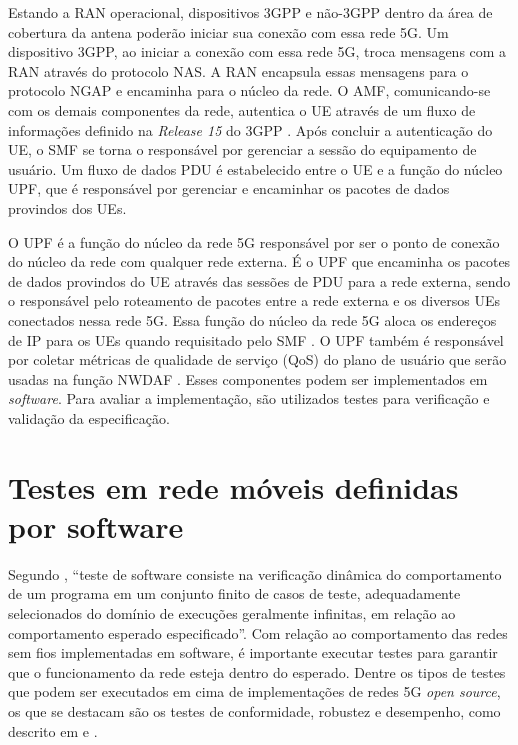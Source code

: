 Estando a RAN operacional, dispositivos 3GPP e não-3GPP dentro da área de cobertura da antena poderão iniciar sua conexão com essa rede 5G. Um dispositivo 3GPP, ao iniciar a conexão com essa rede 5G, troca mensagens com a RAN através do protocolo NAS. A RAN encapsula essas mensagens para o protocolo NGAP e encaminha para o núcleo da rede. O AMF, comunicando-se com os demais componentes da rede, autentica o UE através de um fluxo de informações definido na \textit{Release 15} do 3GPP \cite{3gpp.29.509}. Após concluir a autenticação do UE, o SMF se torna o responsável por gerenciar a sessão do equipamento de usuário. Um fluxo de dados PDU é estabelecido entre o UE e a função do núcleo UPF, que é responsável por gerenciar e encaminhar os pacotes de dados provindos dos UEs.

O UPF é a função do núcleo da rede 5G responsável por ser o ponto de conexão do núcleo da rede com qualquer rede externa.
É o UPF que encaminha os pacotes de dados provindos do UE através das sessões de PDU para a rede externa, sendo o responsável pelo roteamento de pacotes entre a rede externa e os diversos UEs conectados nessa rede 5G.
Essa função do núcleo da rede 5G aloca os endereços de IP para os UEs quando requisitado pelo SMF \cite{3gpp.23.501}.
O UPF também é responsável por coletar métricas de qualidade de serviço (QoS) do plano de usuário que serão usadas na função NWDAF \cite{3gpp.23.548}. 
Esses componentes podem ser implementados em \textit{software}. Para avaliar a implementação, são utilizados testes para verificação e validação da especificação.

\section{Testes em rede móveis definidas por software}

Segundo \cite[p.~2, tradução nossa]{Bertolino2003}, ``teste de software consiste na verificação dinâmica do comportamento de um programa em um conjunto finito de casos de teste, adequadamente selecionados do domínio de execuções geralmente infinitas, em relação ao comportamento esperado especificado''.
Com relação ao comportamento das redes sem fios implementadas em software, é importante executar testes para garantir que o funcionamento da rede esteja dentro do esperado.
Dentre os tipos de testes que podem ser executados em cima de implementações de redes 5G \textit{open source}, os que se destacam são os testes de conformidade, robustez e desempenho, como descrito em  e .

